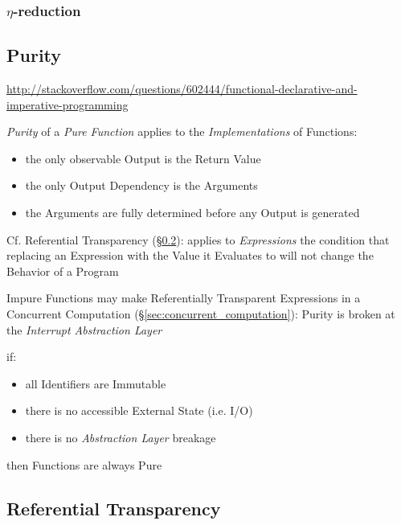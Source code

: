 \subsubsection{$\eta$-reduction}\label{sec:eta_reduction}



\subsection{Purity}\label{sec:pure_function}

\url{http://stackoverflow.com/questions/602444/functional-declarative-and-imperative-programming}

\emph{Purity} of a \emph{Pure Function} applies to the
\emph{Implementations} of Functions:
\begin{itemize}
  \item the only observable Output is the Return Value
  \item the only Output Dependency is the Arguments
  \item the Arguments are fully determined before any Output is
    generated
\end{itemize}

\fist Cf. Referential Transparency
(\S\ref{sec:referential_transparency}): applies to \emph{Expressions}
the condition that replacing an Expression with the Value it Evaluates
to will not change the Behavior of a Program

Impure Functions may make Referentially Transparent Expressions in a
Concurrent Computation (\S\ref{sec:concurrent_computation}): Purity is
broken at the \emph{Interrupt Abstraction Layer} %

if:
\begin{itemize}
  \item all Identifiers are Immutable
  \item there is no accessible External State (i.e. I/O)
  \item there is no \emph{Abstraction Layer} breakage
\end{itemize}
then Functions are always Pure



\subsection{Referential Transparency}\label{sec:referential_transparency}

